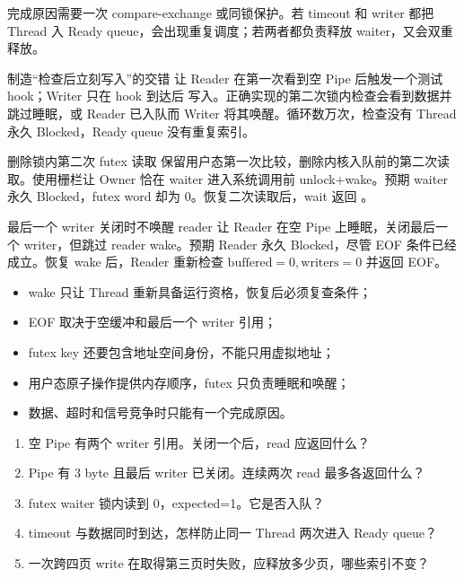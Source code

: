 完成原因需要一次 compare-exchange 或同锁保护。若 timeout 和 writer 都把
Thread 入 Ready queue，会出现重复调度；若两者都负责释放 waiter，又会双重
释放。

\begin{experimentbox}{制造“检查后立刻写入”的交错}
让 Reader 在第一次看到空 Pipe 后触发一个测试 hook；Writer 只在 hook 到达后
写入。正确实现的第二次锁内检查会看到数据并跳过睡眠，或 Reader 已入队而
Writer 将其唤醒。循环数万次，检查没有 Thread 永久 Blocked，Ready queue
没有重复索引。
\end{experimentbox}

\begin{faultinjectionbox}{删除锁内第二次 futex 读取}
保留用户态第一次比较，删除内核入队前的第二次读取。使用栅栏让 Owner 恰在
waiter 进入系统调用前 unlock+wake。预期 waiter 永久 Blocked，futex word
却为 0。恢复二次读取后，wait 返回 。
\end{faultinjectionbox}

\begin{faultinjectionbox}{最后一个 writer 关闭时不唤醒 reader}
让 Reader 在空 Pipe 上睡眠，关闭最后一个 writer，但跳过 reader wake。预期
Reader 永久 Blocked，尽管 EOF 条件已经成立。恢复 wake 后，Reader 重新检查
\(\text{buffered}=0,\text{writers}=0\) 并返回 EOF。
\end{faultinjectionbox}

\begin{pitfallbox}
\begin{itemize}[leftmargin=2.2em]
  \item wake 只让 Thread 重新具备运行资格，恢复后必须复查条件；
  \item EOF 取决于空缓冲和最后一个 writer 引用；
  \item futex key 还要包含地址空间身份，不能只用虚拟地址；
  \item 用户态原子操作提供内存顺序，futex 只负责睡眠和唤醒；
  \item 数据、超时和信号竞争时只能有一个完成原因。
\end{itemize}
\end{pitfallbox}


\begin{enumerate}[leftmargin=2.2em]
  \item 空 Pipe 有两个 writer 引用。关闭一个后，read 应返回什么？
  \item Pipe 有 3 byte 且最后 writer 已关闭。连续两次 read 最多各返回什么？
  \item futex waiter 锁内读到 0，expected=1。它是否入队？
  \item timeout 与数据同时到达，怎样防止同一 Thread 两次进入 Ready queue？
  \item 一次跨四页 write 在取得第三页时失败，应释放多少页，哪些索引不变？
\end{enumerate}

